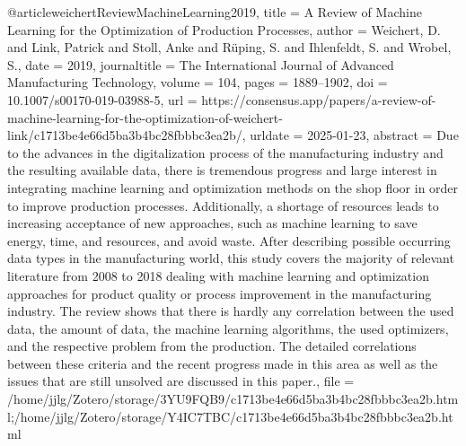 {{{{@article{weichertReviewMachineLearning2019,
  title = {A Review of Machine Learning for the Optimization of Production Processes},
  author = {Weichert, D. and Link, Patrick and Stoll, Anke and Rüping, S. and Ihlenfeldt, S. and Wrobel, S.},
  date = {2019},
  journaltitle = {The International Journal of Advanced Manufacturing Technology},
  volume = {104},
  pages = {1889--1902},
  doi = {10.1007/s00170-019-03988-5},
  url = {https://consensus.app/papers/a-review-of-machine-learning-for-the-optimization-of-weichert-link/c1713be4e66d5ba3b4bc28fbbbc3ea2b/},
  urldate = {2025-01-23},
  abstract = {Due to the advances in the digitalization process of the manufacturing industry and the resulting available data, there is tremendous progress and large interest in integrating machine learning and optimization methods on the shop floor in order to improve production processes. Additionally, a shortage of resources leads to increasing acceptance of new approaches, such as machine learning to save energy, time, and resources, and avoid waste. After describing possible occurring data types in the manufacturing world, this study covers the majority of relevant literature from 2008 to 2018 dealing with machine learning and optimization approaches for product quality or process improvement in the manufacturing industry. The review shows that there is hardly any correlation between the used data, the amount of data, the machine learning algorithms, the used optimizers, and the respective problem from the production. The detailed correlations between these criteria and the recent progress made in this area as well as the issues that are still unsolved are discussed in this paper.},
  file = {/home/jjlg/Zotero/storage/3YU9FQB9/c1713be4e66d5ba3b4bc28fbbbc3ea2b.html;/home/jjlg/Zotero/storage/Y4IC7TBC/c1713be4e66d5ba3b4bc28fbbbc3ea2b.html}
}

}}}}
